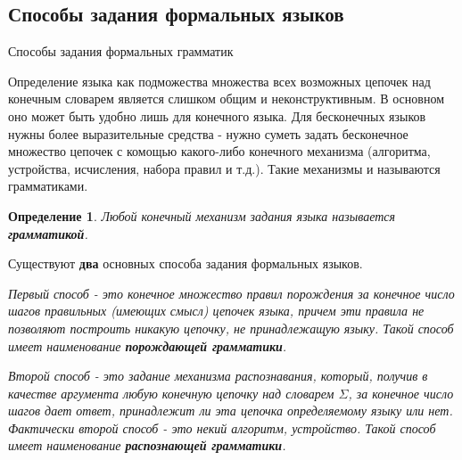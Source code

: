 \documentclass[12pt, pdf, hyperref={unicode},handout]{beamer}
\newtheorem{dfn}{Определение}
\begin{document}
\subsection{Способы задания формальных языков}
\begin{frame}{Способы задания формальных грамматик}
  \begin{block}

    \small{
      Определение языка как подможества множества всех возможных цепочек над конечным словарем является слишком общим и неконструктивным. В основном оно может быть удобно лишь для конечного языка. Для бесконечных языков нужны более выразительные средства - нужно суметь задать бесконечное множество цепочек с комощью какого-либо конечного механизма (алгоритма, устройства, исчисления, набора правил и т.д.). Такие механизмы и называются грамматиками.
      \begin{dfn}
        Любой конечный механизм задания языка называется \textbf{грамматикой}.
      \end{dfn}

      Существуют \textbf{два}   основных способа задания формальных языков.

      \textit{Первый способ - это конечное множество правил порождения за конечное число шагов правильных (имеющих смысл) цепочек языка, причем эти правила не позволяют построить никакую цепочку, не принадлежащую языку. Такой способ имеет наименование \textbf{порождающей грамматики}.}

      \textit{Второй способ - это задание механизма распознавания, который, получив в качестве аргумента любую конечную цепочку над словарем $\Sigma$, за конечное число шагов дает ответ, принадлежит ли эта цепочка определяемому языку или нет. Фактически второй способ  - это некий алгоритм, устройство. Такой способ имеет наименование \textbf{распознающей грамматики}.}
      
      }

  \end{block}
  
\end{frame}
\end{document}
